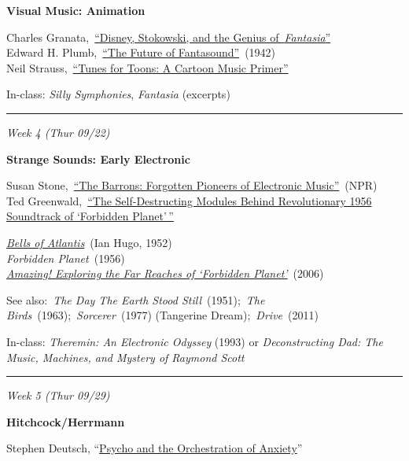 \documentclass[]{tufte-handout}
\begin{document}
\textbf{Visual Music: Animation}

Charles
Granata,~\href{http://dokoissho.sdf.org/ksc-call/soundtracks/pdf/stokowski-fantasia.pdf}{``Disney,
Stokowski, and the Genius of~\emph{Fantasia}''}\\
Edward H.
Plumb,~\href{http://www.widescreenmuseum.com/sound/fantasound2.htm}{``The
Future of Fantasound''}~(1942)\\
Neil
Strauss,~\href{http://dokoissho.sdf.org/ksc-call/soundtracks/pdf/tunes-toons-intro.pdf}{``Tunes
for Toons: A Cartoon Music Primer''}

In-class: \emph{Silly Symphonies}, \emph{Fantasia} (excerpts)

\begin{center}\rule{0.5\linewidth}{0.5pt}\end{center}

\emph{Week 4 (Thur 09/22)}

\textbf{Strange Sounds: Early Electronic}

Susan
Stone,~\href{https://www.npr.org/templates/story/story.php?storyId=4486840}{``The
Barrons: Forgotten Pioneers of Electronic Music''}~(NPR)\\
Ted
Greenwald,~\href{https://www.effectrode.com/knowledge-base/the-self-destructing-modules-behind-revolutionary-1956-soundtrack-of-forbidden-planet/}{``The
Self-Destructing Modules Behind Revolutionary 1956 Soundtrack of
`Forbidden Planet'\,''}

\href{https://www.youtube.com/watch?v=fNodsrQhQ28}{\emph{Bells of
Atlantis}}~(Ian Hugo, 1952)\\
\emph{Forbidden Planet}~(1956)\\
\href{https://drive.google.com/file/d/19U-hq-JlZdRrODsLb4_dqVlUMXjavivr/view?usp=sharing}{\emph{Amazing!
Exploring the Far Reaches of `Forbidden Planet'}}~(2006)

See also:~\emph{The Day The Earth Stood Still}~(1951);~\emph{The
Birds}~(1963);~\emph{Sorcerer}~(1977) (Tangerine
Dream);~\emph{Drive}~(2011)

In-class: \emph{Theremin: An Electronic Odyssey} (1993) or
\emph{Deconstructing Dad: The Music, Machines, and Mystery of Raymond
Scott}

\begin{center}\rule{0.5\linewidth}{0.5pt}\end{center}

\emph{Week 5 (Thur 09/29)}

\textbf{Hitchcock/Herrmann}

Stephen Deutsch,
``\href{https://canvas.emerson.edu/courses/1622820/files/92106270/download?wrap=1}{Psycho
and the Orchestration of Anxiety}''
\end{document}
